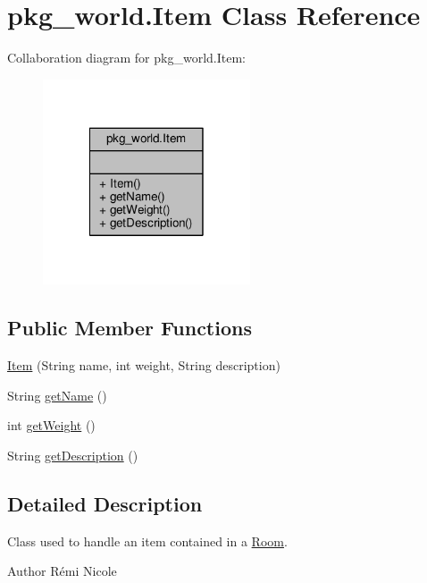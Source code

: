 \hypertarget{classpkg__world_1_1Item}{\section{pkg\-\_\-world.\-Item Class Reference}
\label{classpkg__world_1_1Item}
}


Collaboration diagram for pkg\-\_\-world.\-Item\-:
\nopagebreak
\begin{figure}[H]
\begin{center}
\leavevmode
\includegraphics[width=174pt]{classpkg__world_1_1Item__coll__graph}
\end{center}
\end{figure}
\subsection*{Public Member Functions}
\begin{DoxyCompactItemize}
\item 
\hyperlink{classpkg__world_1_1Item_a57474f01fd9f40be8d01edc1ad79171c}{Item} (String name, int weight, String description)
\item 
String \hyperlink{classpkg__world_1_1Item_a2ac9495ef1a08f01df7f66a46ca895c2}{get\-Name} ()
\item 
int \hyperlink{classpkg__world_1_1Item_a4e4d16b3d657683d482e4e131f8d0571}{get\-Weight} ()
\item 
String \hyperlink{classpkg__world_1_1Item_a2fb9a737f363fe6c0a50280c8630fcd0}{get\-Description} ()
\end{DoxyCompactItemize}


\subsection{Detailed Description}
Class used to handle an item contained in a \hyperlink{classpkg__world_1_1Room}{Room}. \begin{DoxyAuthor}{Author}
Rémi Nicole 
\end{DoxyAuthor}


